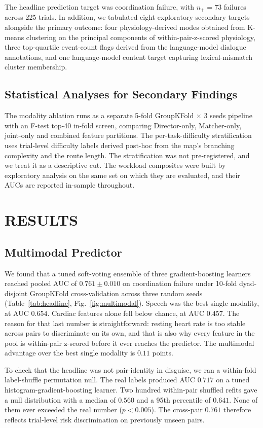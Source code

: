 The headline prediction target was coordination failure, with $n_+ = 73$ failures across 225 trials. In addition, we tabulated eight exploratory secondary targets alongside the primary outcome: four physiology-derived modes obtained from K-means clustering on the principal components of within-pair-z-scored physiology, three top-quartile event-count flags derived from the language-model dialogue annotations, and one language-model content target capturing lexical-mismatch cluster membership.

\section{Statistical Analyses for Secondary Findings}
The modality ablation runs as a separate 5-fold GroupKFold $\times$ 3 seeds pipeline with an F-test top-40 in-fold screen, comparing Director-only, Matcher-only, joint-only and combined feature partitions. The per-task-difficulty stratification uses trial-level difficulty labels derived post-hoc from the map's branching complexity and the route length. The stratification was not pre-registered, and we treat it as a descriptive cut. The workload composites were built by exploratory analysis on the same set on which they are evaluated, and their AUCs are reported in-sample throughout.


\chapter{RESULTS}\label{sec:results}

\section{Multimodal Predictor}\label{sec:multimodal}
We found that a tuned soft-voting ensemble of three gradient-boosting learners reached pooled AUC of $0.761 \pm 0.010$ on coordination failure under 10-fold dyad-disjoint GroupKFold cross-validation across three random seeds (Table~\ref{tab:headline}, Fig.~\ref{fig:multimodal}). Speech was the best single modality, at AUC $0.654$. Cardiac features alone fell below chance, at AUC $0.457$. The reason for that last number is straightforward: resting heart rate is too stable across pairs to discriminate on its own, and that is also why every feature in the pool is within-pair z-scored before it ever reaches the predictor. The multimodal advantage over the best single modality is $0.11$ points.

To check that the headline was not pair-identity in disguise, we ran a within-fold label-shuffle permutation null. The real labels produced AUC $0.717$ on a tuned histogram-gradient-boosting learner. Two hundred within-pair shuffled refits gave a null distribution with a median of $0.560$ and a 95th percentile of $0.641$. None of them ever exceeded the real number ($p < 0.005$). The cross-pair $0.761$ therefore reflects trial-level risk discrimination on previously unseen pairs.

